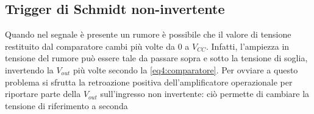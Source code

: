 \subsection{Trigger di Schmidt non-invertente}

Quando nel segnale è presente un rumore è possibile che il valore di tensione restituito dal comparatore cambi più volte da $0$ a $V_{CC}$. Infatti, l'ampiezza in tensione del rumore può essere tale da passare sopra e sotto la tensione di soglia, invertendo la $V_{out}$ più volte secondo la \ref{eq4:comparatore}. Per ovviare a questo problema si sfrutta la retroazione positiva dell'amplificatore operazionale per riportare parte della $V_{out}$ sull'ingresso non invertente: ciò permette di cambiare la tensione di riferimento a seconda 